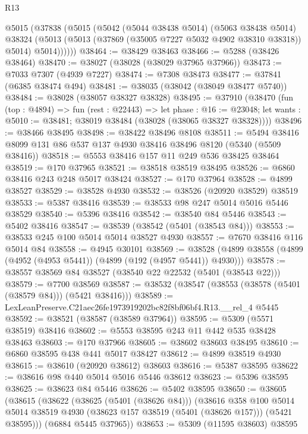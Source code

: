 \begin{lexlean}{R13}
\begin{coremodule}
      @5015
        (@37838
          (@5015
            (@5042
              (@5044 @38438 @5014)
              (@5063 @38438 @5014)
              @38324
              (@5013 (@5013 (@37869 (@35005 @7227 @5032 @4902 @38310 @38318)) @5014) @5014))))))
@38464 := @38429 @38463
@38466 := @5288 (@38426 @38464)
@38470 := @38027 (@38028 (@38029 @37965 @37966))
@38473 := @7033 @7307 (@4939 @7227)
@38474 := @7308 @38473
@38477 := @37841 (@6385 @38474 @494)
@38481 := @38035 (@38042 (@38049 @38477 @5740))
@38484 := @38028 (@38057 @38327 @38328)
@38495 := @37910
    (@38470
      (fun (top : @4894) =>
      fun (rest : @22443) =>
      let phase : @16 := @23048;
      let wants : @5010 := @38481; @38019 @38484 (@38028 (@38065 @38327 @38328))))
@38496 := @38466 @38495
@38498 := @38422 @38496 @8108
@38511 := @5494 @38416 @8099 @131 @86 @537 @137 @4930 @38416 @38496 @8120 (@5340 (@5509 @38416))
@38518 := @5553 @38416 @157 @11 @249 @536 @38425 @38464
@38519 := @170 @37965
@38521 := @38518 @38519 @38495
@38526 := @6860 @38416 @243 @248 @5017 @38424
@38527 := @170 @37964
@38528 := @4899 @38527
@38529 := @38528 @4930
@38532 := @38526 (@20920 @38529) @38519
@38533 := @5387 @38416
@38539 := @38533 @98 @247 @5014 @5016 @5446 @38529
@38540 := @5396 @38416
@38542 := @38540 @84 @5446
@38543 := @5402 @38416
@38547 := @38539 (@38542 (@5401 (@38543 @84)))
@38553 := @38533 @245 @100 @5014 @5014 @38527 @4930
@38557 := @7670 @38416 @116 @5014 @84
@38558 := @4945 @30101
@38569 := @38528 (@4899 @38558 (@4899 (@4952 (@4953 @5441)) (@4899 (@192 (@4957 @5441)) @4930)))
@38578 := @38557 @38569 @84 @38527 (@38540 @22 @22532 (@5401 (@38543 @22)))
@38579 := @7700 @38569
@38587 := @38532 (@38547 (@38553 (@38578 (@5401 (@38579 @84))) (@5421 @38416)))
@38589 := LexLeanPreserve.C21aec26fe1973919202bc82f8bf06bf4.R13.__rel_4 @5445
@38592 := @38521 (@38587 (@38589 @37964))
@38595 := @5309 (@5571 @38519) @38416
@38602 := @5553 @38595 @243 @11 @442 @535 @38428 @38463
@38603 := @170 @37966
@38605 := @38602 @38603 @38495
@38610 := @6860 @38595 @438 @441 @5017 @38427
@38612 := @4899 @38519 @4930
@38615 := @38610 (@20920 @38612) @38603
@38616 := @5387 @38595
@38622 := @38616 @98 @440 @5014 @5016 @5446 @38612
@38623 := @5396 @38595
@38625 := @38623 @84 @5446
@38626 := @5402 @38595
@38650 := @38605
    (@38615
      (@38622
        (@38625 (@5401 (@38626 @84)))
        (@38616
          @358
          @100
          @5014
          @5014
          @38519
          @4930
          (@38623 @157 @38519 (@5401 (@38626 @157)))
          (@5421 @38595)))
      (@6884 @5445 @37965))
@38653 := @5309 (@11595 @38603) @38595

\end{coremodule}
\end{lexlean}
